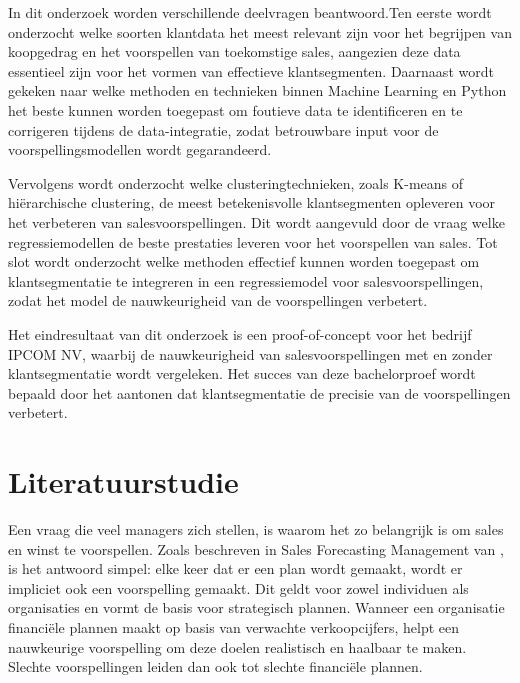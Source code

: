 In dit onderzoek worden verschillende deelvragen beantwoord.Ten eerste wordt onderzocht welke soorten klantdata het meest relevant zijn voor het begrijpen van koopgedrag en het voorspellen van toekomstige sales, aangezien deze data essentieel zijn voor het vormen van effectieve klantsegmenten. Daarnaast wordt gekeken naar welke methoden en technieken binnen Machine Learning en Python het beste kunnen worden toegepast om foutieve data te identificeren en te corrigeren tijdens de data-integratie, zodat betrouwbare input voor de voorspellingsmodellen wordt gegarandeerd. 

Vervolgens wordt onderzocht welke clusteringtechnieken, zoals K-means of hiërarchische clustering, de meest betekenisvolle klantsegmenten opleveren voor het verbeteren van salesvoorspellingen. Dit wordt aangevuld door de vraag welke regressiemodellen de beste prestaties leveren voor het voorspellen van sales. Tot slot wordt onderzocht welke methoden effectief kunnen worden toegepast om klantsegmentatie te integreren in een regressiemodel voor salesvoorspellingen, zodat het model de nauwkeurigheid van de voorspellingen verbetert.

Het eindresultaat van dit onderzoek is een proof-of-concept voor het bedrijf IPCOM NV, waarbij de nauwkeurigheid van salesvoorspellingen met en zonder klantsegmentatie wordt vergeleken. Het succes van deze bachelorproef wordt bepaald door het aantonen dat klantsegmentatie de precisie van de voorspellingen verbetert.


\section{Literatuurstudie}%
\label{sec:literatuurstudie}

Een vraag die veel managers zich stellen, is waarom het zo belangrijk is om sales en winst te voorspellen. Zoals beschreven in Sales Forecasting Management van \textcite{JohnT.Mentzer2004}, is het antwoord simpel: elke keer dat er een plan wordt gemaakt, wordt er impliciet ook een voorspelling gemaakt. Dit geldt voor zowel individuen als organisaties en vormt de basis voor strategisch plannen. Wanneer een organisatie financiële plannen maakt op basis van verwachte verkoopcijfers, helpt een nauwkeurige voorspelling om deze doelen realistisch en haalbaar te maken. Slechte voorspellingen leiden dan ook tot slechte financiële plannen.


